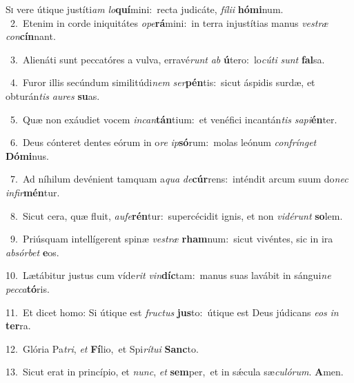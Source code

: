 \lettrine{\initial\textcolor{\initialcolor}{S}}{i} vere útique justíti\textit{am} \textit{lo}\-\textbf{quí}mini:~\star recta judicáte, \textit{fí}\-\textit{li}\textit{i} \textbf{hó}\-\textbf{mi}num.\\
{\numbfont\textcolor{\numbcolor}{~2.}}~Etenim in corde iniquitátes \textit{o}\-\textit{pe}\textbf{rá}mini:~\star in terra injustítias manus \textit{ves}\-\textit{træ} \textit{con}\-\textbf{cín}nant.\par
{\numbfont\textcolor{\numbcolor}{~3.}}~Alienáti sunt peccatóres a vulva, erravé\textit{runt} \textit{ab} \textbf{ú}\-tero:~\star lo\-\textit{cú}\-\textit{ti} \textit{sunt} \textbf{fal}\-sa.\par
{\numbfont\textcolor{\numbcolor}{~4.}}~Furor illis secúndum similitúdi\textit{nem} \textit{ser}\-\textbf{pén}tis:~\star sicut áspidis surdæ, et obturán\textit{tis} \textit{au}\-\textit{res} \textbf{su}\-as.\par
{\numbfont\textcolor{\numbcolor}{~5.}}~Quæ non exáudiet vocem \textit{in}\-\textit{can}\textbf{tán}tium:~\star et venéfici incantán\textit{tis} \textit{sa}\-\textit{pi}\textbf{én}ter.\par
{\numbfont\textcolor{\numbcolor}{~6.}}~Deus cónteret dentes eórum in o\textit{re} \textit{ip}\-\textbf{só}rum:~\star molas leónum \textit{con}\-\textit{frín}\textit{get} \textbf{Dó}\-\textbf{mi}nus.\par
{\numbfont\textcolor{\numbcolor}{~7.}}~Ad níhilum devénient tamquam a\textit{qua} \textit{de}\-\textbf{cúr}rens:~\star inténdit arcum suum do\textit{nec} \textit{in}\-\textit{fir}\textbf{mén}tur.\par
{\numbfont\textcolor{\numbcolor}{~8.}}~Sicut cera, quæ fluit, \textit{au}\-\textit{fe}\textbf{rén}tur:~\star supercécidit ignis, et non \textit{vi}\-\textit{dé}\textit{runt} \textbf{so}\-lem.\par
{\numbfont\textcolor{\numbcolor}{~9.}}~Priúsquam intellígerent spinæ \textit{ves}\-\textit{træ} \textbf{rham}\-num:~\star sicut vivéntes, sic in ira \textit{ab}\-\textit{sór}\textit{bet} \textbf{e}\-os.\par
{\numbfont\textcolor{\numbcolor}{10.}}~Lætábitur justus cum víde\textit{rit} \textit{vin}\-\textbf{díc}tam:~\star manus suas lavábit in sángui\textit{ne} \textit{pec}\-\textit{ca}\textbf{tó}ris.\par
{\numbfont\textcolor{\numbcolor}{11.}}~Et dicet homo: Si útique est \textit{fruc}\-\textit{tus} \textbf{jus}\-to:~\star útique est Deus júdicans \textit{e}\-\textit{os} \textit{in} \textbf{ter}\-ra.\par
{\numbfont\textcolor{\numbcolor}{12.}}~Glória Pa\-\textit{tri}\-, \textit{et} \textbf{Fí}\-lio,~\star et Spi\-\textit{rí}\-\textit{tu}\textit{i} \textbf{Sanc}\-to.\par
{\numbfont\textcolor{\numbcolor}{13.}}~Sicut erat in princípio, et \textit{nunc}\-, \textit{et} \textbf{sem}\-per,~\star et in sǽcula sæ\-\textit{cu}\-\textit{ló}\textit{rum}. \textbf{A}\-men.\par

